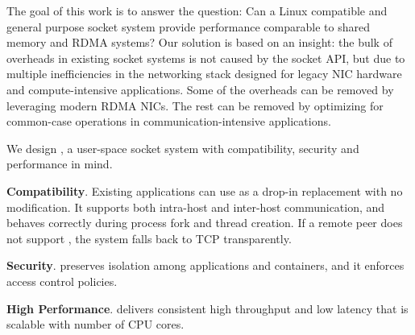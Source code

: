 
The goal of this work is to answer the question: Can a Linux compatible and general purpose socket system provide performance comparable to shared memory and RDMA systems?
Our solution is based on an insight: the bulk of overheads in existing socket systems is not caused by the socket API, but due to multiple inefficiencies in the networking stack designed for legacy NIC hardware and compute-intensive applications.
Some of the overheads can be removed by leveraging modern RDMA NICs.
The rest can be removed by optimizing for common-case operations in communication-intensive applications.

We design \sys{}, a user-space socket system with compatibility, security and performance in mind.
\begin{ecompact}
	\item \textbf{Compatibility}.
	Existing applications can use \sys{} as a drop-in replacement with no modification.
	It supports both intra-host and inter-host communication, and behaves correctly during process fork and thread creation.
	If a remote peer does not support \sys{}, the system falls back to TCP transparently.
	\item \textbf{Security}.
	\sys{} preserves isolation among applications and containers, and it enforces access control policies.
	\item \textbf{High Performance}.
	\sys{} delivers consistent high throughput and low latency that is scalable with number of CPU cores.
\end{ecompact}




